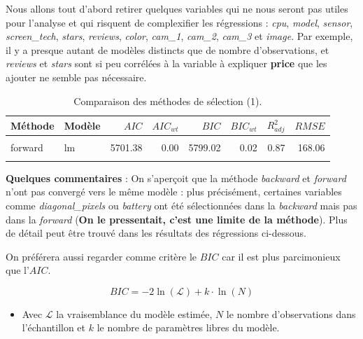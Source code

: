 \documentclass[
  12pt,
]{report}
\providecommand{\tightlist}{%
  \setlength{\itemsep}{0pt}\setlength{\parskip}{0pt}}\usepackage{longtable,booktabs,array}
\begin{document}
Nous allons tout d'abord retirer quelques variables qui ne nous seront
pas utiles pour l'analyse et qui risquent de complexifier les
régressions : \emph{cpu}, \emph{model}, \emph{sensor},
\emph{screen\_tech}, \emph{stars}, \emph{reviews}, \emph{color},
\emph{cam\_1}, \emph{cam\_2}, \emph{cam\_3} et \emph{image}. Par
exemple, il y a presque autant de modèles distincts que de nombre
d'observations, et \emph{reviews} et \emph{stars} sont si peu corrélées
à la variable à expliquer \textbf{price} que les ajouter ne semble pas
nécessaire.

\begin{table}[!h]

\caption{\label{tab:kable_perf}Comparaison des méthodes de sélection (1).}
\centering
\begin{tabular}[t]{llrrrrrr}
\toprule
\textbf{Méthode} & \textbf{Modèle} & \textbf{$AIC$} & \textbf{$AIC_{wt}$} & \textbf{$BIC$} & \textbf{$BIC_{wt}$} & \textbf{$R^2_{adj}$} & \textbf{$RMSE$}\\
\midrule
\cellcolor{gray!6}{backward} & \cellcolor{gray!6}{lm} & \cellcolor{gray!6}{5690.77} & \cellcolor{gray!6}{0.99} & \cellcolor{gray!6}{5800.62} & \cellcolor{gray!6}{0.01} & \cellcolor{gray!6}{0.88} & \cellcolor{gray!6}{164.86}\\
forward & lm & 5701.38 & 0.00 & 5799.02 & 0.02 & 0.87 & 168.06\\
\cellcolor{gray!6}{genetic} & \cellcolor{gray!6}{lm} & \cellcolor{gray!6}{5705.54} & \cellcolor{gray!6}{0.00} & \cellcolor{gray!6}{5790.98} & \cellcolor{gray!6}{0.97} & \cellcolor{gray!6}{0.87} & \cellcolor{gray!6}{170.05}\\
\bottomrule
\end{tabular}
\end{table}

\textbf{Quelques commentaires} : On s'aperçoit que la méthode
\emph{backward} et \emph{forward} n'ont pas convergé vers le même modèle
: plus précisément, certaines variables comme \emph{diagonal\_pixels} ou
\emph{battery} ont été sélectionnées dans la \emph{backward} mais pas
dans la \emph{forward} (\textbf{On le pressentait, c'est une limite de
la méthode}). Plus de détail peut être trouvé dans les résultats des
régressions ci-dessous.

On préférera aussi regarder comme critère le \(BIC\) car il est plus
parcimonieux que l'\(AIC\).

\[ BIC = -2\ln(\mathcal{L}) + k \cdot \ln(N) \]

\begin{itemize}
\tightlist
\item
  Avec \(\mathcal{L}\) la vraisemblance du modèle estimée, \(N\) le
  nombre d'observations dans l'échantillon et \(k\) le nombre de
  paramètres libres du modèle.
\end{itemize}
\end{document}
